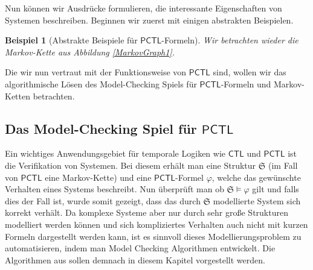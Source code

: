 \documentclass{lni}
\theoremstyle{def_style}
\theoremstyle{break}
\newtheorem{example}{Beispiel}
\newcommand{\CTL}{\mathsf{CTL}}
\newcommand{\PCTL}{\mathsf{PCTL}}
\begin{document}
Nun können wir Ausdrücke formulieren, die interessante Eigenschaften von Systemen beschreiben. Beginnen wir zuerst mit einigen abstrakten Beispielen.
\begin{example}[Abstrakte Beispiele für $\PCTL$-Formeln]
	\label{PCTLBeispiel}
	Wir betrachten wieder die Markov-Kette aus Abbildung \ref{MarkovGraph1}.
\end{example}

Die wir nun vertraut mit der Funktionsweise von $\PCTL$ sind, wollen wir das algorithmische Lösen des Model-Checking Spiels für $\PCTL$-Formeln und Markov-Ketten betrachten.

\subsection{Das Model-Checking Spiel für $\PCTL$}

Ein wichtiges Anwendungsgebiet für temporale Logiken wie $\CTL$ und $\PCTL$ ist die Verifikation von Systemen. 
Bei diesem erhält man eine Struktur $\mathfrak{S}$ (im Fall von $\PCTL$ eine Markov-Kette) und eine $\PCTL$-Formel $\varphi$, welche das gewünschte Verhalten eines Systems beschreibt. 
Nun überprüft man ob $\mathfrak{S}\models \varphi$ gilt und falls dies der Fall ist, wurde somit gezeigt, dass das durch $\mathfrak{S}$ modellierte System sich korrekt verhält.
Da komplexe Systeme aber nur durch sehr große Strukturen modelliert werden können und sich kompliziertes Verhalten auch nicht mit kurzen Formeln dargestellt werden kann, ist es sinnvoll dieses Modellierungsproblem zu automatisieren, indem man Model Checking Algorithmen entwickelt. 
Die Algorithmen aus \cite{hansson1994logic} sollen demnach in diesem Kapitel vorgestellt werden.
\end{document}
